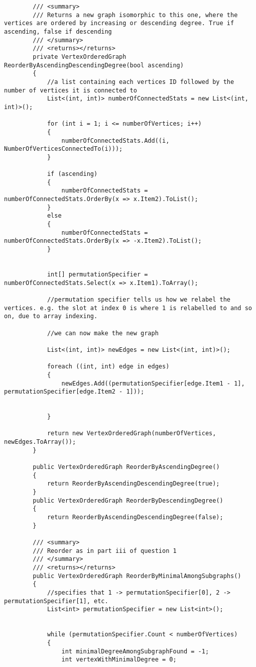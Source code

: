 \documentclass{article}
\begin{document}
\begin{lstlisting}
		/// <summary>
		/// Returns a new graph isomorphic to this one, where the vertices are ordered by increasing or descending degree. True if ascending, false if descending
		/// </summary>
		/// <returns></returns>
		private VertexOrderedGraph ReorderByAscendingDescendingDegree(bool ascending)
		{
			//a list containing each vertices ID followed by the number of vertices it is connected to
			List<(int, int)> numberOfConnectedStats = new List<(int, int)>();
			
			for (int i = 1; i <= numberOfVertices; i++)
			{
				numberOfConnectedStats.Add((i, NumberOfVerticesConnectedTo(i)));
			}
			
			if (ascending)
			{
				numberOfConnectedStats = numberOfConnectedStats.OrderBy(x => x.Item2).ToList();
			}
			else
			{
				numberOfConnectedStats = numberOfConnectedStats.OrderBy(x => -x.Item2).ToList();
			}
			
			
			int[] permutationSpecifier = numberOfConnectedStats.Select(x => x.Item1).ToArray();
			
			//permutation specifier tells us how we relabel the vertices. e.g. the slot at index 0 is where 1 is relabelled to and so on, due to array indexing.
			
			//we can now make the new graph
			
			List<(int, int)> newEdges = new List<(int, int)>();
			
			foreach ((int, int) edge in edges)
			{
				newEdges.Add((permutationSpecifier[edge.Item1 - 1], permutationSpecifier[edge.Item2 - 1]));
				
				
			}
			
			return new VertexOrderedGraph(numberOfVertices, newEdges.ToArray());
		}
		
		public VertexOrderedGraph ReorderByAscendingDegree()
		{
			return ReorderByAscendingDescendingDegree(true);
		}
		public VertexOrderedGraph ReorderByDescendingDegree()
		{
			return ReorderByAscendingDescendingDegree(false);
		}
		
		/// <summary>
		/// Reorder as in part iii of question 1
		/// </summary>
		/// <returns></returns>
		public VertexOrderedGraph ReorderByMinimalAmongSubgraphs()
		{
			//specifies that 1 -> permutationSpecifier[0], 2 -> permutationSpecifier[1], etc.
			List<int> permutationSpecifier = new List<int>();
			
			
			while (permutationSpecifier.Count < numberOfVertices)
			{
				int minimalDegreeAmongSubgraphFound = -1;
				int vertexWithMinimalDegree = 0;
				

\end{lstlisting}
\end{document}
